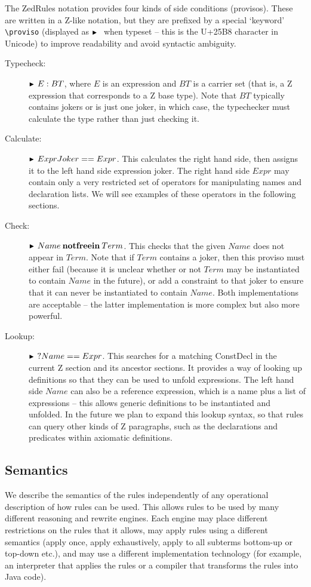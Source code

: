 \documentclass{entcs}
\begin{document}
The ZedRules notation provides four kinds of side conditions (provisos).
These are written in a Z-like notation, but they are prefixed by
a special `keyword' \verb!\proviso! (displayed as $\proviso$ when
typeset -- this is the U+25B8 character in Unicode) to improve
readability and avoid syntactic ambiguity. 
\begin{description}
\item[Typecheck:] $\proviso E:BT$, where $E$ is an expression and $BT$
  is a carrier set (that is, a Z expression that corresponds to a Z
  base type).  Note that $BT$ 
  typically contains jokers or is just one joker, in which case, the
  typechecker must calculate the type rather than just checking it.
\item[Calculate:] $\proviso ExprJoker == Expr$.
  This calculates the right hand side, then assigns it to the left hand
  side expression joker.
  The right hand side $Expr$ may contain only a very restricted set of
  operators for manipulating names and declaration lists.  We will see
  examples of these operators in the following sections.
\item[Check:] $\proviso Name \notfreein Term$.
  This checks that the given $Name$ does not appear in $Term$.
  Note that if $Term$ contains a joker, then this proviso must either
  fail (because it is unclear whether or not $Term$ may be
  instantiated to contain $Name$ in the future), or add a
  constraint to that joker to ensure that it can never be instantiated to
  contain $Name$.  Both implementations are acceptable -- the latter
  implementation is more complex but also more powerful.
\item[Lookup:] $\proviso? Name==Expr$.
  This searches for a matching ConstDecl in the current Z section
  and its ancestor sections.  It provides a way of looking up 
  definitions so that they can be used to unfold expressions.
  The left hand side $Name$ can also be a reference expression,
  which is a name plus a list of expressions -- this allows generic
  definitions to be instantiated and unfolded.  In the future we plan
  to expand this lookup syntax, so that rules can query other kinds of
  Z paragraphs, such as the declarations and predicates within 
  axiomatic definitions.
\end{description}

\subsection{Semantics}

We describe the semantics of the rules independently of any operational
description of how rules can be used. 
This allows rules to be used by many different reasoning and rewrite
engines.  Each engine may place different restrictions on the rules
that it allows, may apply rules using a different semantics (apply once,
apply exhaustively, apply to all subterms bottom-up or top-down etc.), and
may use a different implementation technology (for example, an interpreter
that applies the rules or a compiler that transforms the rules into Java
code).
\end{document}
